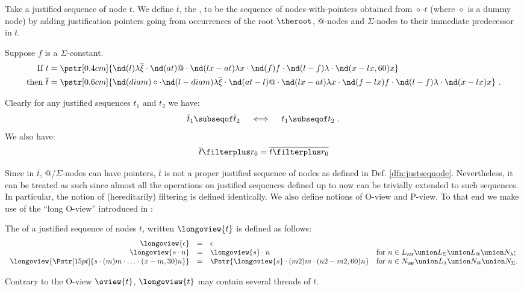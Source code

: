 Take a justified sequence of node $t$. We define $\overline{t}$, the ,
to be the sequence of nodes-with-pointers obtained from $\diamond \cdot t$ (where
$\diamond$ is a dummy node) by adding justification pointers going
from occurrences of the root $\theroot$, @-nodes and $\Sigma$-nodes
to their immediate predecessor in $t$.
\begin{example} Suppose $f$ is a $\Sigma$-constant.
\begin{align*}
\mbox{If }  t &= \pstr[0.4cm]{ \nd(l){\lambda \overline{\xi}} \cdot \nd(at)@ \cdot \nd(lx-at){\lambda x}\cdot   \nd(f)f \cdot \nd(l-f){\lambda} \cdot \nd(x-lx,60)x} \\
\mbox{then }  \overline{t} &= \pstr[0.6cm]{ \nd(diam)\diamond \cdot \nd(l-diam){\lambda \overline{\xi}}
 \cdot  \nd(at-l)@\cdot  \nd(lx-at){\lambda x}\cdot
\nd(f-lx)f\cdot \nd(l-f){\lambda}\cdot \nd(x-lx)x}\ .
\end{align*}
\end{example}

Clearly for any justified sequences $t_1$ and $t_2$ we have:
\begin{equation}
 \overline{t}_1 \subseqof  \overline{t}_2 \quad \iff \quad t_1 \subseqof  t_2 \label{eqn:hat_subseq} \ .
\end{equation}
We also have:
\begin{equation}
 \overline{t} \filterplus r_0 = \overline{t \filterplus r_0} \label{eqn:hatfilter_eq_filterhat}
\end{equation}



Since in $\overline{t}$, @/$\Sigma$-nodes can have pointers,
$\overline{t}$ is not a proper justified sequence of nodes as
defined in Def. \ref{dfn:justseqnode}. Nevertheless, it can be
treated as such since almost all the operations on justified
sequences defined up to now can be trivially extended to such
sequences. In particular, the notion of (hereditarily) filtering is
defined identically. We also define notions of O-view and P-view. To
that end we make use of the ``long O-view'' introduced in
\cite{Harmer2005}:
\begin{definition}
The  of a justified sequence of nodes $t$,
written $\longoview{t}$ is defined as follows:
$$\begin{array}{rcll}
 \longoview{\epsilon} &=&  \epsilon \\
 \longoview{s \cdot n }  &=&  \longoview{s} \cdot n
    & \mbox{for $n \in L_{\sf var} \union L_\Sigma \union L_@ \union N_\lambda$;}
    \\
 \longoview{\Pstr[15pt]{s \cdot (m){m} \cdot \ldots \cdot (x-m,30){n}}} &=&
    \Pstr{ \longoview{s} \cdot (m2){m} \cdot (n2-m2,60){n} }
    & \mbox{for $n \in N_{\sf var} \union L_\lambda \union N_@ \union N_\Sigma$.}
\end{array}$$
\end{definition}
Contrary to the O-view $\oview{t}$, $\longoview{t}$ may contain
several threads of $t$.

